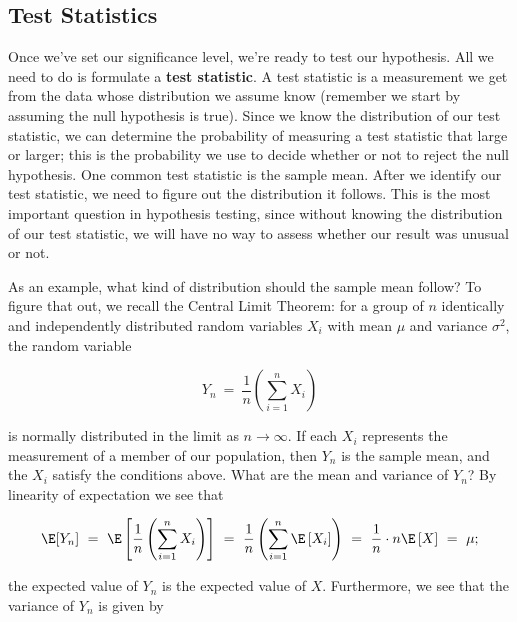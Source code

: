 \subsection{Test Statistics}

Once we've set our significance level, we're ready to test our hypothesis. All we need to do is formulate a \textbf{test statistic}. A test statistic is a measurement we get from the data whose distribution we assume know (remember we start by assuming the null hypothesis is true). Since we know the distribution of our test statistic, we can determine the probability of measuring a test statistic that large or larger; this is the probability we use to decide whether or not to reject the null hypothesis.  One common test statistic is the sample mean. After we identify our test statistic, we need to figure out the distribution it follows.  This is the most important question in hypothesis testing, since without knowing the distribution of our test statistic, we will have no way to assess whether our result was unusual or not.



As an example, what kind of distribution should the sample mean follow?  To figure that out, we recall the Central Limit Theorem: for a group of $n$ identically and independently distributed random variables $X_i$ with mean $\mu$ and variance $\sigma^2$, the random variable

\begin{equation*}

Y_n\ = \ \frac{1}{n}\left(\sum_{i=1}^{n} X_i\right)

\end{equation*}

is normally distributed in the limit as $n\rightarrow\infty$. If each $X_{i}$ represents the measurement of a member of our population, then $Y_n$ is the sample mean, and the $X_{i}$ satisfy the conditions above. What are the mean and variance of $Y_n$? By linearity of expectation we see that

\begin{equation*}

\E[Y_n]\ = \ \E\left[\frac{1}{n}\left(\sum_{i=1}^{n} X_i\right)\right]\ = \ \frac{1}{n}\left(\sum_{i=1}^{n}  \E\left[X_{i}\right]\right)\ =\ \frac{1}{n}\cdot n\E\left[X\right]\ = \ \mu;

\end{equation*}

the expected value of $Y_n$ is the expected value of $X$. Furthermore, we see that the variance of $Y_n$ is given by

